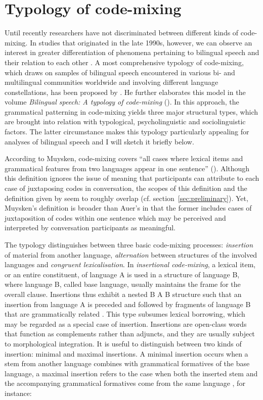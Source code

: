 \section{Typology of code-mixing}
Until recently researchers have not discriminated between different kinds of code-mixing. In studies that originated in the late 1990s, however, we can observe an interest in greater differentiation of phenomena pertaining to bilingual speech and their relation to each other \citep[cf.][]{auer-codeswitching-1999}. A most comprehensive typology of code-mixing, which draws on samples of bilingual speech encountered in various bi- and multilingual communities worldwide and involving different language constellations, has been proposed by \citet{muysken-code-switching-1997}. He further elaborates this model in the volume \textit{Bilingual speech: A typology of code-mixing} (\citeyear{muysken-bilingual-2000}). In this approach, the grammatical patterning in code-mixing yields three major structural types, which are brought into relation with typological, psycholinguistic and sociolinguistic factors. The latter circumstance makes this typology particularly appealing for analyses of bilingual speech and I will sketch it briefly below.

According to Muysken, code-mixing covers ``all cases where lexical items and grammatical features from two languages appear in one sentence'' (\citeyear[][1]{muysken-bilingual-2000}). Although this definition ignores the issue of meaning that participants can attribute to each case of juxtaposing codes in conversation, the scopes of this definition and the definition given by \citet{auer-codeswitching-1999} seem to roughly overlap (cf. section~\ref{sec:preliminary}). Yet, Muysken's definition is broader than Auer's in that the former includes cases of juxtaposition of codes within one sentence which may be perceived and interpreted by conversation participants as meaningful.

The typology distinguishes between three basic code-mixing processes: \textit{insertion} of material from another language, \textit{alternation} between structures of the involved languages and \textit{congruent lexicalisation}. In \textit{insertional code-mixing}, a lexical item, or an entire constituent, of language A is used in a structure of language B, where language B, called base language, usually maintains the frame for the overall clause. Insertions thus exhibit a nested B A B structure such that an insertion from language A is preceded and followed by fragments of language B that are grammatically related \citep[cf.][61--69]{muysken-bilingual-2000}. This type subsumes lexical borrowing, which may be regarded as a special case of insertion. Insertions are open-class words that function as complements rather than adjuncts, and they are usually subject to morphological integration. It is useful to distinguish between two kinds of insertion: minimal and maximal insertions. A minimal insertion occurs when a stem from another language combines with grammatical formatives of the base language, a maximal insertion refers to the case when both the inserted stem and the accompanying grammatical formatives come from the same language \citep[cf.][]{auer2014}, for instance:

